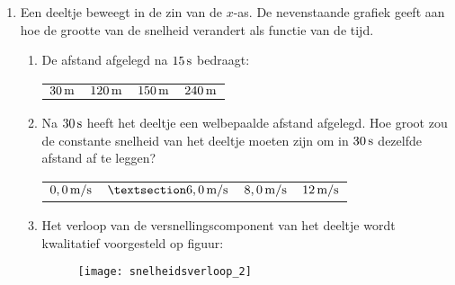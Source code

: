 \begin{enumerate}
\item 
\begin{minipage}[t]{0.6\textwidth}
Een deeltje beweegt in de zin van de $x$-as. De nevenstaande grafiek geeft aan hoe de grootte van de snelheid verandert als functie van de tijd.
\begin{enumerate}
\item De afstand afgelegd na $15\rm\,s$ bedraagt:
\newline
\begin{tabularx}{\textwidth}{XXXX}
$30\rm\,m$&$120\rm\,m$&$150\rm\,m$&$240\rm\,m$
\end{tabularx}
\item Na $30\rm\,s$ heeft het deeltje een welbepaalde afstand afgelegd. Hoe groot zou de constante snelheid van het deeltje moeten zijn om in $30\rm\,s$ dezelfde afstand af te leggen?
\newline
\begin{tabularx}{\textwidth}{XXXX}
$0,0\rm\,m/s$&$§6,0\rm\,m/s$&$8,0\rm\,m/s$&$12\rm\,m/s$
\end{tabularx}
\end{enumerate}
\end{minipage}
\hspace{2mm}
\begin{minipage}[t]{0.3\textwidth}
\end{minipage}
\begin{enumerate}
\setcounter{enumii}{2}
\item Het verloop van de versnellingscomponent van het deeltje wordt kwalitatief voorgesteld op figuur:
\begin{figure}[h]
\begin{flushright}
\texttt{[image: snelheidsverloop\_2]}
\end{flushright}
\end{figure}
\end{enumerate}


\end{enumerate}
